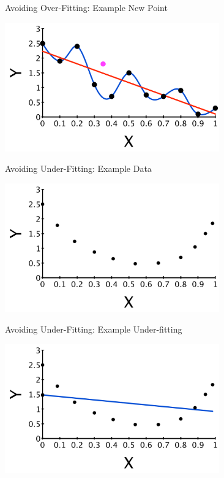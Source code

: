 \documentclass[aspectratio=169]{beamer}
\begin{document}

\begin{frame}{Avoiding Over-Fitting: Example New Point}

\vspace{1em}
\includegraphics[height=15em]{./lectReg/overfitEx4.pdf}
\end{frame}


\begin{frame}{Avoiding Under-Fitting: Example Data}

\vspace{1em}
\includegraphics[height=15em]{./lectReg/OverUnderData2.pdf}
\end{frame}

\begin{frame}{Avoiding Under-Fitting: Example Under-fitting}

\vspace{1em}
\includegraphics[height=15em]{./lectReg/OverUnderDataU2.pdf}
\end{frame}
\end{document}
